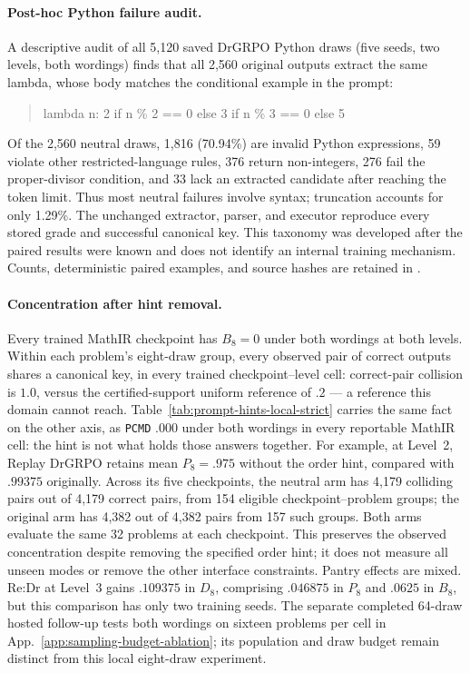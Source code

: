 \documentclass{article}
\newcommand{\1}{\mathbf 1}
\newcommand{\pmd}{\texttt{PCMD}}
\theoremstyle{remark}
\theoremstyle{definition}
\theoremstyle{plain}
\begin{document}
\paragraph{Post-hoc Python failure audit.}
A descriptive audit of all 5,120 saved DrGRPO Python draws (five seeds,
two levels, both wordings) finds that all 2,560 original outputs extract
the same lambda, whose body matches the conditional example in the prompt:
\begin{quote}\footnotesize\ttfamily
lambda n: 2 if n \% 2 == 0 else 3 if n \% 3 == 0 else 5
\end{quote}
Of the 2,560 neutral draws, 1,816 (70.94\%) are invalid Python expressions,
59 violate other restricted-language rules, 376 return non-integers,
276 fail the proper-divisor condition, and 33 lack an extracted candidate
after reaching the token limit. Thus most neutral failures involve syntax;
truncation accounts for only 1.29\%. The unchanged extractor, parser, and
executor reproduce every stored grade and successful canonical key.
This taxonomy was developed after the paired results were known and does
not identify an internal training mechanism. Counts, deterministic paired
examples, and source hashes are retained in
.

\paragraph{Concentration after hint removal.}
Every trained MathIR checkpoint has $B_8=0$ under both wordings at both levels.
Within each problem's eight-draw group, every observed pair of correct
outputs shares a canonical key, in every trained checkpoint--level cell:
correct-pair collision is $1.0$, versus the
certified-support uniform reference of $.2$ --- a reference this domain
cannot reach.
Table~\ref{tab:prompt-hints-local-strict}
carries the same fact on the other axis, as \pmd{} $.000$ under both wordings in
every reportable MathIR cell: the hint is not what holds those answers together. For example, at Level~2, Replay
DrGRPO retains mean $P_8=.975$ without the order hint, compared with $.99375$
originally. Across its five checkpoints, the neutral arm has 4,179 colliding
pairs out of 4,179 correct pairs, from 154 eligible checkpoint--problem
groups; the original arm has 4,382 out of 4,382 pairs from 157 such groups.
Both arms evaluate the same 32 problems at each checkpoint. This preserves
the observed concentration despite removing the specified order hint; it does
not measure all unseen modes or remove the other interface constraints.
Pantry effects are mixed. Re:Dr at Level~3 gains $.109375$ in $D_8$,
comprising $.046875$ in $P_8$ and $.0625$ in $B_8$, but this comparison has only
two training seeds. The separate completed 64-draw hosted follow-up
tests both wordings on sixteen problems per cell in
App.~\ref{app:sampling-budget-ablation}; its population and draw budget
remain distinct from this local eight-draw experiment.
\end{document}
